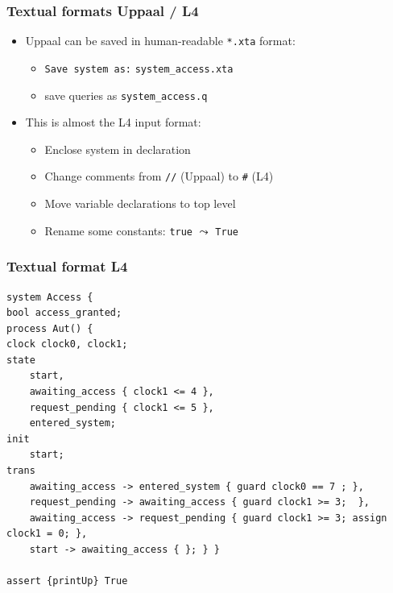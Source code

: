 \documentclass{beamer}
\begin{document}
\begin{frame}[fragile]\frametitle{Textual formats Uppaal / L4}

  \begin{itemize}
  \item Uppaal can be saved in human-readable \texttt{*.xta} format:
    \begin{itemize}
    \item \texttt{Save system as:} \texttt{system\_access.xta}
    \item save queries as \texttt{system\_access.q}
    \end{itemize}
  \item This is almost the L4 input format:
    \begin{itemize}
    \item Enclose system in declaration
    \item Change comments from \texttt{//} (Uppaal) to \texttt{\#} (L4)
    \item Move variable declarations to top level
    \item Rename some constants: \texttt{true} $\leadsto$ \texttt{True}
    \end{itemize}
  \end{itemize}
  
\end{frame}

\begin{frame}[fragile]\frametitle{Textual format L4}

  \begin{lstlisting}
system Access {
bool access_granted;
process Aut() {
clock clock0, clock1;
state
    start,
    awaiting_access { clock1 <= 4 },
    request_pending { clock1 <= 5 },
    entered_system;
init
    start;
trans
    awaiting_access -> entered_system { guard clock0 == 7 ; },
    request_pending -> awaiting_access { guard clock1 >= 3;  },
    awaiting_access -> request_pending { guard clock1 >= 3; assign clock1 = 0; },
    start -> awaiting_access { }; } }

assert {printUp} True
  \end{lstlisting}
  

\end{frame}
\end{document}
